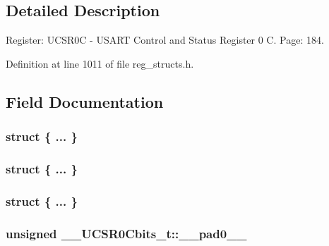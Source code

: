 \subsection{Detailed Description}
Register\+: U\+C\+S\+R0\+C -\/ U\+S\+A\+R\+T Control and Status Register 0 C. Page\+: 184. 

Definition at line 1011 of file reg\+\_\+structs.\+h.



\subsection{Field Documentation}
\hypertarget{union_____u_c_s_r0_cbits__t_ac16738235b39efe2f11daa6e0fbb1400}{\subsubsection[{"@245}]{\setlength{\rightskip}{0pt plus 5cm}struct \{ ... \} }}\label{union_____u_c_s_r0_cbits__t_ac16738235b39efe2f11daa6e0fbb1400}
\hypertarget{union_____u_c_s_r0_cbits__t_aa1ec9df93c8b86622de59dbbef0a6f10}{\subsubsection[{"@247}]{\setlength{\rightskip}{0pt plus 5cm}struct \{ ... \} }}\label{union_____u_c_s_r0_cbits__t_aa1ec9df93c8b86622de59dbbef0a6f10}
\hypertarget{union_____u_c_s_r0_cbits__t_a201975846d4f266375a845aa858ae6a3}{\subsubsection[{"@249}]{\setlength{\rightskip}{0pt plus 5cm}struct \{ ... \} }}\label{union_____u_c_s_r0_cbits__t_a201975846d4f266375a845aa858ae6a3}
\hypertarget{union_____u_c_s_r0_cbits__t_a6644bdacc520176893763eefbef33500}{
\subsubsection[{\+\_\+\+\_\+pad0\+\_\+\+\_\+}]{\setlength{\rightskip}{0pt plus 5cm}unsigned \+\_\+\+\_\+\+U\+C\+S\+R0\+Cbits\+\_\+t\+::\+\_\+\+\_\+pad0\+\_\+\+\_\+}}\label{union_____u_c_s_r0_cbits__t_a6644bdacc520176893763eefbef33500}


